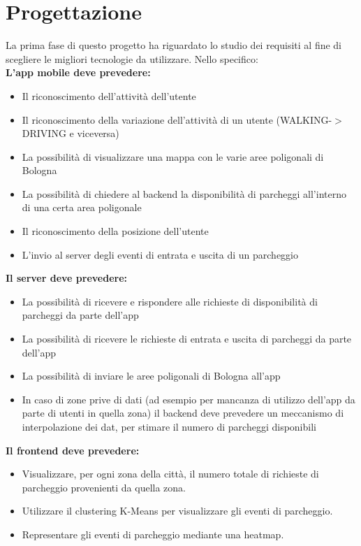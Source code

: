 \documentclass[../../Report.tex]{subfiles}
\begin{document}
    \chapter{Progettazione}
    La prima fase di questo progetto ha riguardato lo studio dei requisiti al fine di scegliere le migliori tecnologie da utilizzare. Nello specifico:\\
    \textbf{L'app mobile deve prevedere:}
        \begin{itemize}
            \item Il riconoscimento dell'attività dell'utente
            \item Il riconoscimento della variazione dell'attività di un utente (WALKING-$>$ DRIVING e viceversa)
            \item La possibilità di visualizzare una mappa con le varie aree poligonali di Bologna
            \item La possibilità di chiedere al backend la disponibilità di parcheggi all'interno di una certa area poligonale
            \item Il riconoscimento della posizione dell'utente
            \item L'invio al server degli eventi di entrata e uscita di un parcheggio
        \end{itemize}
    \textbf{Il server deve prevedere:}
        \begin{itemize}
            \item La possibilità di ricevere e rispondere alle richieste di disponibilità di parcheggi da parte dell'app
            \item La possibilità di ricevere le richieste di entrata e uscita di parcheggi da parte dell'app
            \item La possibilità di inviare le aree poligonali di Bologna all'app
            \item In caso di zone prive di dati (ad esempio per mancanza di utilizzo dell'app da parte di utenti in quella zona) il backend deve prevedere un meccanismo di interpolazione dei dat, per stimare il numero di parcheggi disponibili
        \end{itemize}
    \textbf{Il frontend deve prevedere:}
        \begin{itemize}
            \item Visualizzare, per ogni zona della città, il numero totale di richieste di parcheggio provenienti da quella zona.
            \item  Utilizzare il clustering K-Means per visualizzare gli eventi di parcheggio.
            \item Representare gli eventi di parcheggio mediante una heatmap.
        \end{itemize}
        
\end{document}
